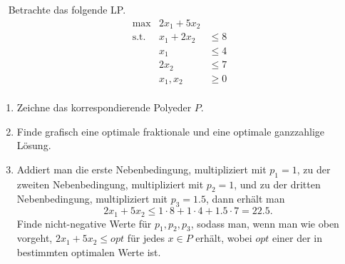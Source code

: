 \documentclass{uebung_cs}
\begin{document}
\begin{aufgabe}[LP]\
%
	Betrachte das folgende \acs{LP}.
	\[
		\begin{array}{rrllll}
			\text{max} &   2 x_1 +5 x_2 \\	
			\text{s.t.} 
			&  x_1 + 2x_2 &\leq 8\\
			&  x_1  &\leq 4\\
			& 2x_2 &\leq 7\\
			& x_1,x_2&\geq  0\\
		\end{array}
	\] 
	
	\begin{enumerate}
		\item Zeichne das korrespondierende Polyeder $P$.
		\item Finde grafisch eine optimale fraktionale und eine optimale ganzzahlige Lösung.
		\item Addiert man die erste Nebenbedingung, multipliziert mit $p_1 = 1$, zu der zweiten Nebenbedingung, multipliziert mit $p_2 = 1$, und zu der dritten Nebenbedingung, multipliziert mit $p_3 = 1.5$, dann erhält man
		$$2x_1+5x_2\leq 1\cdot 8+ 1\cdot 4+1.5\cdot 7= 22.5.$$
		Finde nicht-negative Werte für $p_1, p_2, p_3$, sodass man, wenn man wie oben vorgeht, $2x_1 + 5x_2 \leq opt$ für jedes $x \in P$ erhält, wobei $opt$ einer der in  bestimmten optimalen Werte ist.
	\end{enumerate}
\end{aufgabe}
\end{document}
